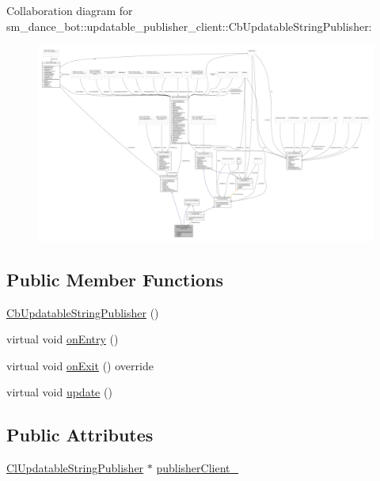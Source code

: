 Collaboration diagram for sm\+\_\+dance\+\_\+bot\+:\+:updatable\+\_\+publisher\+\_\+client\+:\+:Cb\+Updatable\+String\+Publisher\+:
\nopagebreak
\begin{figure}[H]
\begin{center}
\leavevmode
\includegraphics[width=350pt]{classsm__dance__bot_1_1updatable__publisher__client_1_1CbUpdatableStringPublisher__coll__graph}
\end{center}
\end{figure}
\subsection*{Public Member Functions}
\begin{DoxyCompactItemize}
\item 
\hyperlink{classsm__dance__bot_1_1updatable__publisher__client_1_1CbUpdatableStringPublisher_a432ac6b8a26b7bd998fac51013a41ea4}{Cb\+Updatable\+String\+Publisher} ()
\item 
virtual void \hyperlink{classsm__dance__bot_1_1updatable__publisher__client_1_1CbUpdatableStringPublisher_a51dac5bd1395e109617fa3d857859d7c}{on\+Entry} ()
\item 
virtual void \hyperlink{classsm__dance__bot_1_1updatable__publisher__client_1_1CbUpdatableStringPublisher_a4aeb5d5c98ae09d25d65afc467d798c2}{on\+Exit} () override
\item 
virtual void \hyperlink{classsm__dance__bot_1_1updatable__publisher__client_1_1CbUpdatableStringPublisher_a4c8a8a2fa212dd0459241944455eb6d3}{update} ()
\end{DoxyCompactItemize}
\subsection*{Public Attributes}
\begin{DoxyCompactItemize}
\item 
\hyperlink{classsm__dance__bot_1_1ClUpdatableStringPublisher}{Cl\+Updatable\+String\+Publisher} $\ast$ \hyperlink{classsm__dance__bot_1_1updatable__publisher__client_1_1CbUpdatableStringPublisher_aa8b2dfbd6b745e3ad2a79520d0a7acba}{publisher\+Client\+\_\+}
\end{DoxyCompactItemize}


